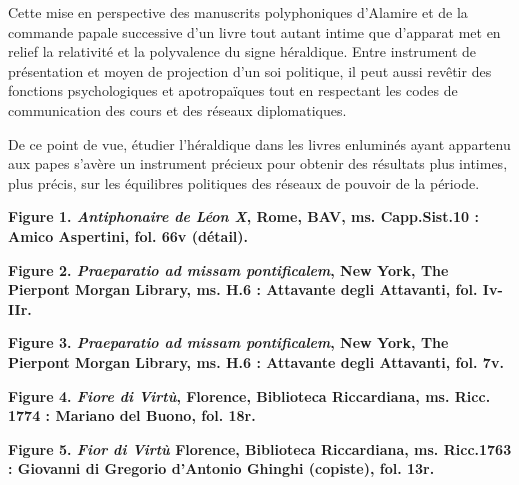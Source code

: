 \documentclass[12pt,twoside,openany]{book}
\begin{document}
Cette mise en perspective des manuscrits polyphoniques d’Alamire et de la commande papale successive d’un livre tout autant intime que d’apparat met en relief la relativité et la polyvalence du signe héraldique. Entre instrument de présentation et moyen de projection d’un soi politique, il peut aussi revêtir des fonctions psychologiques et apotropaïques tout en respectant les codes de communication des cours et des réseaux diplomatiques.

De ce point de vue, étudier l’héraldique dans les livres enluminés ayant appartenu aux papes s’avère un instrument précieux pour obtenir des résultats plus intimes, plus précis, sur les équilibres politiques des réseaux de pouvoir de la période.

\begin{center}
\par\small \textbf{Figure 1. \textit{Antiphonaire de Léon X}, Rome, BAV, ms. Capp.Sist.10 : Amico Aspertini, fol. 66v (détail).}
\end{center}

\begin{center}
\par\small \textbf{Figure 2. \textit{Praeparatio ad missam pontificalem}, New York, The Pierpont Morgan Library, ms. H.6 : Attavante degli Attavanti, fol. Iv-IIr.}
\end{center}

\begin{center}
\par\small \textbf{Figure 3.\textit{ Praeparatio ad missam pontificalem}, New York, The Pierpont Morgan Library, ms. H.6 : Attavante degli Attavanti, fol. 7v.}
\end{center}

\begin{center}
\par\small \textbf{Figure 4. \textit{Fiore di Virtù}, Florence, Biblioteca Riccardiana, ms. Ricc. 1774 : Mariano del Buono, fol. 18r.}
\end{center}

\begin{center}
\par\small \textbf{Figure 5. \textit{Fior di Virtù} Florence, Biblioteca Riccardiana, ms. Ricc.1763 : Giovanni di Gregorio d’Antonio Ghinghi (copiste), fol. 13r.}
\end{center}
\end{document}
